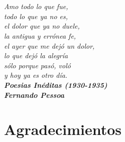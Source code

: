 \chapter*{}


\chapter*{}
\begin{flushright}
	\textit{Amo todo lo que fue,\\
		todo lo que ya no es, \\
		el dolor que ya no duele,\\
		la antigua y err\'{o}nea fe,\\
		el ayer que me dej\'{o} un dolor, \\
		lo que dejó la alegr\'{i}a\\ 
		s\'{o}lo porque pas\'{o}, vol\'{o}\\
		y hoy ya es otro d\'{i}a.}\\
	\vspace{1cm}
	\textbf{\textit{Poesias In\'{e}ditas (1930-1935)}\\
		\textit{Fernando Pessoa}}\\
\end{flushright}

\chapter*{Agradecimientos}





